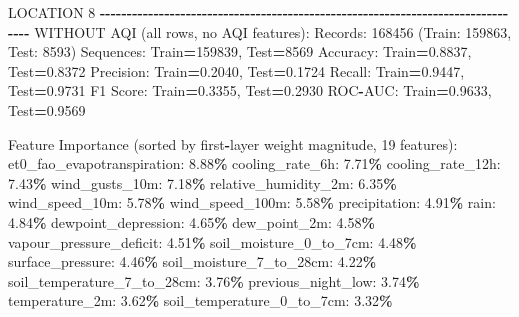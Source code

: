 \documentclass[
  letterpaper,
  DIV=11,
  numbers=noendperiod]{scrartcl}
\newenvironment{Shaded}{\begin{snugshade}}{\end{snugshade}}
\newcommand{\BuiltInTok}[1]{#1}
\newcommand{\DecValTok}[1]{\textcolor[rgb]{0.00,0.00,0.81}{#1}}
\newcommand{\FloatTok}[1]{\textcolor[rgb]{0.00,0.00,0.81}{#1}}
\newcommand{\NormalTok}[1]{#1}
\newcommand{\OperatorTok}[1]{\textcolor[rgb]{0.81,0.36,0.00}{\textbf{#1}}}
\begin{document}
\begin{Shaded}
\begin{Highlighting}[]
\NormalTok{LOCATION }\DecValTok{8}
\OperatorTok{{-}{-}{-}{-}{-}{-}{-}{-}{-}{-}{-}{-}{-}{-}{-}{-}{-}{-}{-}{-}{-}{-}{-}{-}{-}{-}{-}{-}{-}{-}{-}{-}{-}{-}{-}{-}{-}{-}{-}{-}{-}{-}{-}{-}{-}{-}{-}{-}{-}{-}{-}{-}{-}{-}{-}{-}{-}{-}{-}{-}{-}{-}{-}{-}{-}{-}{-}{-}{-}{-}{-}{-}{-}{-}{-}{-}{-}{-}{-}{-}}
\NormalTok{WITHOUT AQI (}\BuiltInTok{all}\NormalTok{ rows, no AQI features):}
\NormalTok{  Records: }\DecValTok{168456}\NormalTok{ (Train: }\DecValTok{159863}\NormalTok{, Test: }\DecValTok{8593}\NormalTok{)}
\NormalTok{  Sequences: Train}\OperatorTok{=}\DecValTok{159839}\NormalTok{, Test}\OperatorTok{=}\DecValTok{8569}
\NormalTok{  Accuracy: Train}\OperatorTok{=}\FloatTok{0.8837}\NormalTok{, Test}\OperatorTok{=}\FloatTok{0.8372}
\NormalTok{  Precision: Train}\OperatorTok{=}\FloatTok{0.2040}\NormalTok{, Test}\OperatorTok{=}\FloatTok{0.1724}
\NormalTok{  Recall: Train}\OperatorTok{=}\FloatTok{0.9447}\NormalTok{, Test}\OperatorTok{=}\FloatTok{0.9731}
\NormalTok{  F1 Score: Train}\OperatorTok{=}\FloatTok{0.3355}\NormalTok{, Test}\OperatorTok{=}\FloatTok{0.2930}
\NormalTok{  ROC}\OperatorTok{{-}}\NormalTok{AUC: Train}\OperatorTok{=}\FloatTok{0.9633}\NormalTok{, Test}\OperatorTok{=}\FloatTok{0.9569}

\NormalTok{  Feature Importance (}\BuiltInTok{sorted}\NormalTok{ by first}\OperatorTok{{-}}\NormalTok{layer weight magnitude, }\DecValTok{19}\NormalTok{ features):}
\NormalTok{    et0\_fao\_evapotranspiration: }\FloatTok{8.88}\OperatorTok{\%}
\NormalTok{    cooling\_rate\_6h: }\FloatTok{7.71}\OperatorTok{\%}
\NormalTok{    cooling\_rate\_12h: }\FloatTok{7.43}\OperatorTok{\%}
\NormalTok{    wind\_gusts\_10m: }\FloatTok{7.18}\OperatorTok{\%}
\NormalTok{    relative\_humidity\_2m: }\FloatTok{6.35}\OperatorTok{\%}
\NormalTok{    wind\_speed\_10m: }\FloatTok{5.78}\OperatorTok{\%}
\NormalTok{    wind\_speed\_100m: }\FloatTok{5.58}\OperatorTok{\%}
\NormalTok{    precipitation: }\FloatTok{4.91}\OperatorTok{\%}
\NormalTok{    rain: }\FloatTok{4.84}\OperatorTok{\%}
\NormalTok{    dewpoint\_depression: }\FloatTok{4.65}\OperatorTok{\%}
\NormalTok{    dew\_point\_2m: }\FloatTok{4.58}\OperatorTok{\%}
\NormalTok{    vapour\_pressure\_deficit: }\FloatTok{4.51}\OperatorTok{\%}
\NormalTok{    soil\_moisture\_0\_to\_7cm: }\FloatTok{4.48}\OperatorTok{\%}
\NormalTok{    surface\_pressure: }\FloatTok{4.46}\OperatorTok{\%}
\NormalTok{    soil\_moisture\_7\_to\_28cm: }\FloatTok{4.22}\OperatorTok{\%}
\NormalTok{    soil\_temperature\_7\_to\_28cm: }\FloatTok{3.76}\OperatorTok{\%}
\NormalTok{    previous\_night\_low: }\FloatTok{3.74}\OperatorTok{\%}
\NormalTok{    temperature\_2m: }\FloatTok{3.62}\OperatorTok{\%}
\NormalTok{    soil\_temperature\_0\_to\_7cm: }\FloatTok{3.32}\OperatorTok{\%}


\end{Highlighting}
\end{Shaded}
\end{document}
